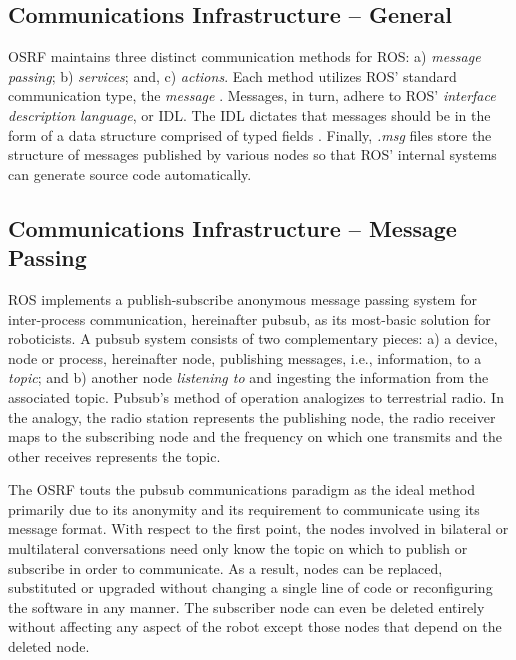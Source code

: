 \documentclass[9pt,twocolumn,twoside]{../../styles/osajnl}
\begin{document}
\subsection{Communications Infrastructure -- General}
OSRF maintains three distinct communication methods for ROS: a) \textit{message passing}; b) \textit{services}; and, c) \textit{actions}.  Each method utilizes ROS' standard communication type, the \textit{message} \cite{www-ros-core-components}.  Messages, in turn, adhere to ROS' \textit{interface description language}, or IDL. The IDL dictates that messages should be in the form of a data structure comprised of typed fields \cite{www-ros-messages}. Finally, \textit{.msg} files store the structure of messages published by various nodes so that ROS' internal systems can generate source code automatically.

\subsection{Communications Infrastructure -- Message Passing}
ROS implements a publish-subscribe anonymous message passing system for inter-process communication, hereinafter pubsub, as its most-basic solution for roboticists.  A pubsub system consists of two complementary pieces: a) a device, node or process, hereinafter node, publishing messages, i.e., information, to a \textit{topic}; and b) another node \textit{listening to} and ingesting the information from the associated topic.  Pubsub's method of operation analogizes to terrestrial radio.  In the analogy, the radio station represents the publishing node, the radio receiver maps to the subscribing node and the frequency on which one transmits and the other receives represents the topic.  

The OSRF touts the pubsub communications paradigm as the ideal method  primarily due to its anonymity and its requirement to communicate using its message format.  With respect to the first point, the nodes involved in bilateral or multilateral conversations need only know the topic on which to publish or subscribe in order to communicate.  As a result, nodes can be replaced, substituted or upgraded without changing a single line of code or reconfiguring the software in any manner.  The subscriber node can even be deleted entirely without affecting any aspect of the robot except those nodes that depend on the deleted node.
\end{document}
